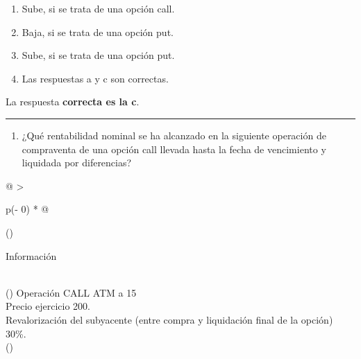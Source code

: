 \documentclass[
  letterpaper,
  DIV=11,
  numbers=noendperiod]{scrreprt}
\providecommand{\tightlist}{%
  \setlength{\itemsep}{0pt}\setlength{\parskip}{0pt}}\usepackage{longtable,booktabs,array}
\begin{document}
\begin{enumerate}
\def\labelenumi{\alph{enumi}.}
\item
  Sube, si se trata de una opción call.
\item
  Baja, si se trata de una opción put.
\item
  Sube, si se trata de una opción put.
\item
  Las respuestas a y c son correctas.
\end{enumerate}

\begin{tcolorbox}[enhanced jigsaw, left=2mm, opacityback=0, colback=white, breakable, arc=.35mm, bottomrule=.15mm, rightrule=.15mm, toprule=.15mm, leftrule=.75mm, colframe=quarto-callout-tip-color-frame]
\begin{minipage}[t]{5.5mm}
\textcolor{quarto-callout-tip-color}{\faLightbulb}
\end{minipage}%
\begin{minipage}[t]{\textwidth - 5.5mm}

La respuesta \textbf{correcta es la c}.

\end{minipage}%
\end{tcolorbox}

\begin{center}\rule{0.5\linewidth}{0.5pt}\end{center}

\begin{enumerate}
\def\labelenumi{\arabic{enumi}.}
\setcounter{enumi}{72}
\tightlist
\item
  ¿Qué rentabilidad nominal se ha alcanzado en la siguiente operación de
  compraventa de una opción call llevada hasta la fecha de vencimiento y
  liquidada por diferencias?
\end{enumerate}

\begin{longtable}[]{@{}
  >{\raggedright\arraybackslash}p{(\columnwidth - 0\tabcolsep) * }@{}}
\toprule()
\begin{minipage}[b]{\linewidth}\raggedright
Información
\end{minipage} \\
\midrule()
\endhead
Operación CALL ATM a 15 \\
Precio ejercicio 200. \\
Revalorización del subyacente (entre compra y liquidación final de la
opción) 30\%. \\
\bottomrule()
\end{longtable}
\end{document}
